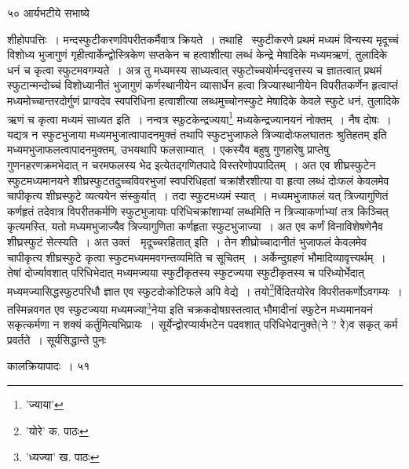 \documentclass[11pt, openany]{book}
\begin{document}
{{{{{\newpage

\vspace{3cm} ५०\hspace{4cm} आर्यभटीये सभाष्ये

\vspace{0.3cm}
\noindent शीहोपपत्तिः~। मन्दस्फुटीकरणविपरीतकर्मैवात्र क्रियते~। तथाहि  \textendash\ स्फुटीकरणे प्रथमं मध्यमं विन्यस्य मृदूच्चं विशोध्य भुजागुणं गृहीत्वार्केन्द्वोस्त्रिकेण सप्तकेन च हत्वाशीत्या लब्धं केन्द्रे मेषादिके मध्यमऋणं, तुलादिके धनं च कृत्वा स्फुटमवगम्यते~। अत्र तु मध्यमस्य साध्यत्वात् स्फुटोच्चयोर्मन्दवृत्तस्य च ज्ञातत्वात् प्रथमं स्फुटान्मन्दोच्चं विशोध्यानीतं भुजागुणं कर्णस्थानीयेन व्यासार्धेन हत्वा त्रिज्यास्थानीयेन विपरीतकर्णेन हृत्वाप्तं मध्यमोच्चान्तरदोर्गुणं प्राग्वदेव स्वपरिधिना हत्वाशीत्या लब्धमुच्चोनस्फुटे मेषादिके केवले स्फुटे धनं, तुलादिके ऋणं च कृत्वा मध्यमं साध्यत इति~। नन्वत्र स्फुटकेन्द्रज्यया\renewcommand{\thefootnote}{१}\footnote{ 'ज्याया'} मध्यकेन्द्रज्यानयनं नोक्तम्~। नैष दोषः~। यद्यत्र न स्फुटभुजाया मध्यमभुजात्वापादनमुक्तं तथापि स्फुटभुजाफले {\qt त्रिज्यादोःफलघाततः श्रुतिहतम्} इति मध्यमभुजाफलत्वापादनमुक्तम्, उभयथापि फलसाम्यात्~। एकस्यैव बहुषु गुणहारेषु प्राप्तेषु गुणनहरणक्रमभेदात् न चरमफलस्य भेद इत्येतद्गणितपादे विस्तरेणोपपादितम्~। अत एव शीघ्रस्फुटेन स्फुटमध्यमानयने शीघ्रस्फुटतदुच्चविवरभुजां स्वपरिधिहतां चक्रांशैरशीत्या वा हृत्वा लब्धं दोःफलं केवलमेव चापीकृत्य शीघ्रस्फुटे व्यत्ययेन संस्कुर्यात्~। तदा स्फुटमध्यमं
स्यात्~। मध्यमभुजाफलं यत् त्रिज्यागुणितं कर्णहृतं तदेवात्र विपरीतकर्मणि स्फुटभुजायाः परिधिचक्रांशाभ्यां लब्धमिति न त्रिज्याकर्णाभ्यां तत्र किञ्चित् कृत्यमस्ति, यतो मध्यमभुजाज्यैव त्रिज्यागुणिता कर्णहृता स्फुटभुजाज्या~। अत एव कर्णं विनाविशेषणेनैव शीघ्रस्फुटं सेत्स्यति~। अत उक्तं~\textendash\
{\qt मृदूच्चरहितात्} इति~। तेन शीघ्रोच्चादानीतं भुजाफलं केवलमेव चापीकृत्य शीघ्रस्फुटे कृत्वा स्फुटमध्यममवगन्तव्यमिति च सूचितम्~। अर्केन्दुग्रहणं भौमादिव्यावृत्त्यर्थम्~। तेषां दोर्ज्यावशात् परिधिभेदात् मध्यमज्यया स्फुटीकृतस्य स्फुटज्यया स्फुटीकृतस्य च परिध्योर्भेदात् मध्यमज्यासिद्धस्फुटपरिधौ ज्ञात एव स्फुटदोःकोटिफले अपि वेद्ये~। तयो\renewcommand{\thefootnote}{२}\footnote{'योरे' क. पाठः}र्विदितयोरेव विपरीतकर्णोऽवगम्यः~। तस्मिन्नवगत एव स्फुटज्यया मध्यमज्या\renewcommand{\thefootnote}{३}\footnote{'ध्यज्या' ख. पाठः}नेया इति चक्रकदोषग्रस्तत्वात् भौमादीनां स्फुटेन मध्यमानयनं सकृत्कर्मणा न शक्यं कर्तुमित्यभिप्रायः~। सूर्येन्द्वोरप्यार्यभटेन पदवशात् परिधिभेदानुक्ते(ने ? रे)व
सकृत् कर्म प्रवर्तते~। सूर्यसिद्धान्ते पुनः\textendash 

\newpage

\vspace{3cm} \hspace{4cm} कालक्रियापादः~।\hspace{4cm} ५१

}}}}}
\end{document}
